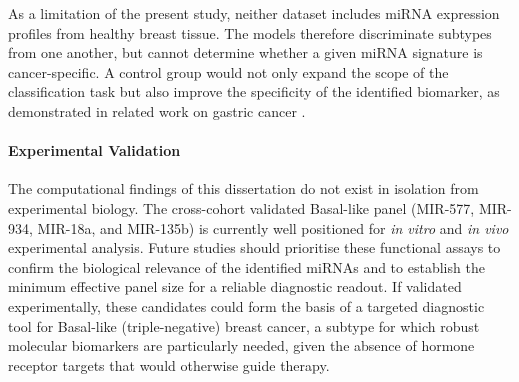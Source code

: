 As a limitation of the present study, neither dataset includes miRNA expression 
profiles from healthy breast tissue. The models therefore discriminate subtypes 
from one another, but cannot determine whether a given miRNA signature is 
cancer-specific. A control group would not only expand the scope of the 
classification task but also improve the specificity of the identified 
biomarker, as demonstrated in related work on gastric cancer 
\cite{ml_gastric_Azari2023}.


\paragraph{Experimental Validation}

The computational findings of this dissertation do not exist in isolation
from experimental biology. The cross-cohort validated Basal-like panel
(MIR-577, MIR-934, MIR-18a, and MIR-135b) is currently well positioned for
\textit{in vitro} and \textit{in vivo} experimental analysis.
Future studies should prioritise these functional assays to confirm the
biological relevance of the identified miRNAs and to establish the minimum
effective panel size for a reliable diagnostic readout. If validated
experimentally, these candidates could form the basis of a targeted
diagnostic tool for Basal-like (triple-negative) breast cancer, a subtype
for which robust molecular biomarkers are particularly needed, given the
absence of hormone receptor targets that would otherwise guide therapy.
